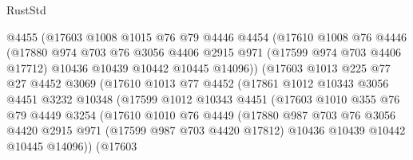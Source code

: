 \begin{lexlean}{RustStd}
\begin{coremodule}
                    @4455
                    (@17603
                      @1008
                      @1015
                      @76
                      @79
                      @4446
                      @4454
                      (@17610
                        @1008
                        @76
                        @4446
                        (@17880
                          @974
                          @703
                          @76
                          @3056
                          @4406
                          @2915
                          @971
                          (@17599 @974 @703 @4406 @17712)
                          @10436
                          @10439
                          @10442
                          @10445
                          @14096))
                      (@17603
                        @1013
                        @225
                        @77
                        @27
                        @4452
                        @3069
                        (@17610
                          @1013
                          @77
                          @4452
                          (@17861
                            @1012
                            @10343
                            @3056
                            @4451
                            @3232
                            @10348
                            (@17599
                              @1012
                              @10343
                              @4451
                              (@17603
                                @1010
                                @355
                                @76
                                @79
                                @4449
                                @3254
                                (@17610
                                  @1010
                                  @76
                                  @4449
                                  (@17880
                                    @987
                                    @703
                                    @76
                                    @3056
                                    @4420
                                    @2915
                                    @971
                                    (@17599 @987 @703 @4420 @17812)
                                    @10436
                                    @10439
                                    @10442
                                    @10445
                                    @14096))
                                (@17603

\end{coremodule}
\end{lexlean}
